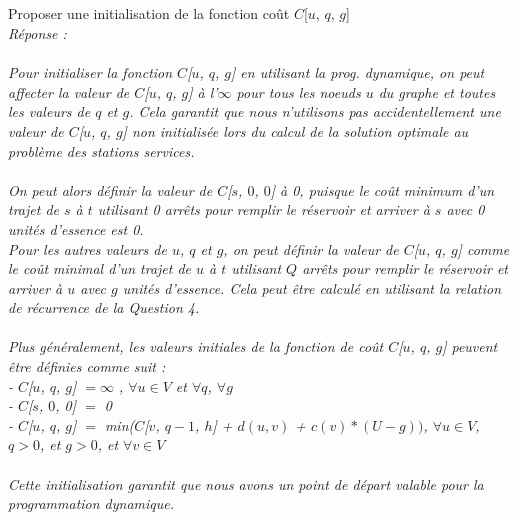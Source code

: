 \documentclass[a4paper,11pt]{article}
\begin{document}
        \subsection{}\label{subsec:Q5}
        Proposer une initialisation de la fonction coût $C$[$u$, $q$, $g$]
            \\\textit{Réponse : \\\\
            Pour initialiser la fonction $C$[$u$, $q$, $g$] en utilisant la prog. dynamique, on peut affecter la valeur de $C$[$u$, $q$, $g$] à l'$\infty$ pour tous les noeuds $u$ du graphe et toutes les valeurs de $q$ et $g$. Cela garantit que nous n'utilisons pas accidentellement une valeur de $C$[$u$, $q$,  $g$] non initialisée lors du calcul de la solution optimale au problème des stations services.\\\\
On peut alors définir la valeur de $C$[$s$, $0$, $0$] à 0, puisque le coût minimum d'un trajet de $s$ à $t$ utilisant 0 arrêts pour remplir le réservoir et arriver à $s$ avec 0 unités d'essence est 0.\\
Pour les autres valeurs de $u$, $q$ et $g$, on peut définir la valeur de $C$[$u$, $q$, $g$] comme le coût minimal d'un trajet de $u$ à $t$ utilisant $Q$ arrêts pour remplir le réservoir et arriver à $u$ avec $g$ unités d'essence. Cela peut être calculé en utilisant la relation de récurrence de la Question 4.\\\\
Plus généralement, les valeurs initiales de la fonction de coût $C$[$u$, $q$, $g$] peuvent être définies comme suit :\\
- $C$[$u$, $q$, $g$] $= \infty$ , $\forall u \in V$ et $\forall q$, $\forall g$\\
- $C$[$s$, $0$, 0] $=$ 0\\
- $C$[$u$, $q$, $g$] $=$ min($C$[$v$, $q - 1$, $h$] + $d(u, v)$ + $c(v) * (U - g))$, $\forall u \in V$, $q > 0$, et $g > 0$, et $\forall v \in V$\\\\
Cette initialisation garantit que nous avons un point de départ valable pour la programmation dynamique.}
            
\end{document}
